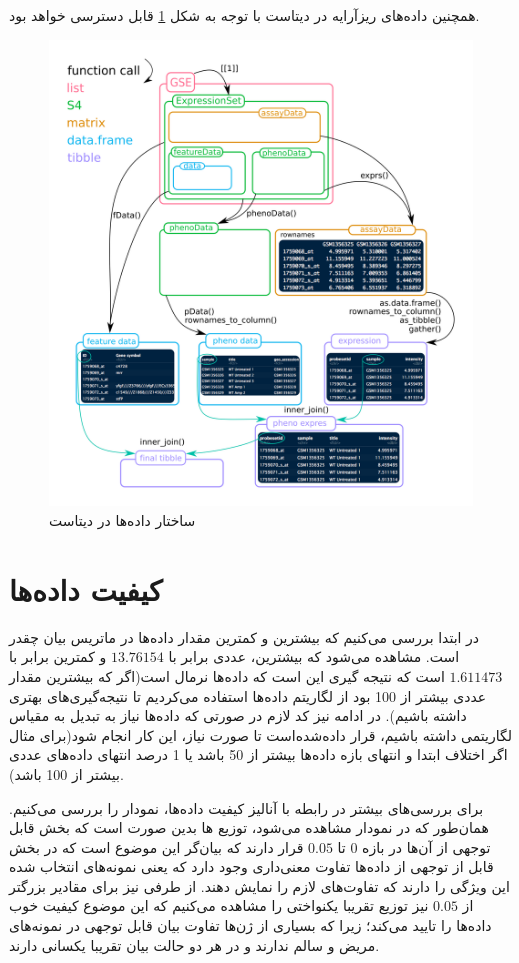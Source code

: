 \documentclass{article}
\begin{document}
همچنین داده‌های ریزآرایه در دیتاست با توجه به شکل \ref{fig:geo-data} قابل دسترسی خواهد بود.
  \begin{figure}[h!]
  	\centering
  	\includegraphics[width=0.8\columnwidth]{figs/geo-data.png}
  	\caption{ساختار داده‌ها در دیتاست \cite{geo-data}}
  	\label{fig:geo-data}
  \end{figure}

\section{کیفیت داده‌ها}
در ابتدا بررسی می‌کنیم که بیشترین و کمترین مقدار داده‌ها در ماتریس بیان چقدر است. مشاهده می‌شود که بیشترین، عددی برابر با
$13.76154$
و کمترین برابر با
$1.611473$
است که نتیجه گیری این است که داده‌ها نرمال است(اگر که بیشترین مقدار عددی بیشتر از 100 بود از لگاریتم داده‌ها استفاده می‌کردیم تا نتیجه‌گیری‌های بهتری داشته باشیم). در ادامه نیز کد لازم در صورتی که داده‌ها نیاز به تبدیل به مقیاس لگاریتمی داشته باشیم، قرار داده‌شده‌است  تا صورت نیاز، این کار انجام شود(برای مثال اگر اختلاف ابتدا و انتهای بازه داده‌ها بیشتر از 50 باشد یا 1 درصد انتهای داده‌های عددی بیشتر از 100 باشد).




برای بررسی‌های بیشتر در رابطه با آنالیز کیفیت داده‌ها، نمودار 
را بررسی می‌کنیم. همان‌طور که در نمودار مشاهده می‌شود،  توزیع 
ها بدین صورت است که بخش قابل توجهی از آن‌ها در بازه $0$ تا $0.05$ قرار دارند که بیان‌گر این موضوع است که در بخش قابل از توجهی از داده‌ها تفاوت معنی‌داری وجود دارد  که یعنی نمونه‌های انتخاب شده این ویژگی را دارند که تفاوت‌های لازم را نمایش دهند. از طرفی نیز برای مقادیر بزرگتر‌ از 
$ 0.05$ 
نیز توزیع تقریبا یکنواختی را مشاهده می‌کنیم که این موضوع کیفیت خوب داده‌ها را تایید می‌کند؛ زیرا که بسیاری از ژن‌ها تفاوت بیان قابل توجهی در نمونه‌های مریض و سالم ندارند و در هر دو حالت بیان تقریبا یکسانی دارند.
\end{document}
